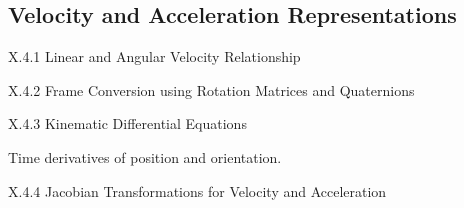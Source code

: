 \subsection{Velocity and Acceleration Representations}

X.4.1 Linear and Angular Velocity Relationship

X.4.2 Frame Conversion using Rotation Matrices and Quaternions

X.4.3 Kinematic Differential Equations

Time derivatives of position and orientation.

X.4.4 Jacobian Transformations for Velocity and Acceleration
